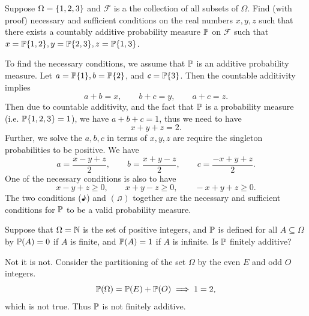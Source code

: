\begin{problem}
	Suppose $ \Omega = \{1,2,3\} $ and $ \mathcal{F} $ is a the collection of all subsets of $ \Omega $. Find (with proof) necessary and sufficient conditions on the real numbers $ x,y,z $ such that there exists a countably additive probability measure $ \mathbb{P} $ on $ \mathcal{F} $ such that $ x = \mathbb{P}\{1,2\}, y=\mathbb{P}\{2,3\}, z=\mathbb{P}\{1,3\} $.
\end{problem}
\begin{solution}
	To find the necessary conditions, we assume that $ \mathbb{P} $ is an additive probability measure. Let $ a = \mathbb{P}\{1\}, b=\mathbb{P}\{2\} $, and $ c = \mathbb{P}\{3\} $. Then the countable additivity implies
	\[ a+b=x,\qquad b+c=y,\qquad a+c=z. \]
	Then due to countable additivity, and the fact that $ \mathbb{P} $ is a probability measure (i.e. $ \mathbb{P}\{1,2,3\} = 1 $), we have $ a+b+c = 1 $, thus we need to have
	\[ x+y+z = 2. \tag{\eighthnote} \]
	Further, we solve the $ a,b,c $ in terms of $ x,y,z $ are require the singleton probabilities to be positive. We have
	\[ a = \frac{x-y+z}{2},\qquad b = \frac{x+y-z}{2},\qquad c=\frac{-x+y+z}{2}. \]
	One of the necessary conditions is also to have
	\[ x-y+z\geq0,\qquad x+y-z\geq0,\qquad -x+y+z \geq0. \tag{\twonotes}  \]
	The two conditions ($ \eighthnote $) and $ (\twonotes) $  together are the necessary and sufficient conditions for $ \mathbb{P} $ to be a valid probability measure.
\end{solution}

\begin{problem}
	Suppose that $ \Omega = \mathbb{N} $ is the set of positive integers, and $ \mathbb{P} $ is defined for all $ A\subseteq \Omega $ by $ \mathbb{P}(A) = 0 $ if $ A $ is finite, and $ \mathbb{P}(A) = 1 $ if $ A $ is infinite. Is $ \mathbb{P} $ finitely additive?
\end{problem}
\begin{solution}
	Not it is not. Consider the partitioning of the set $ \Omega $ by the even $ E $ and odd $ O $ integers.
	\[ \mathbb{P}(\Omega) = \mathbb{P}(E) + \mathbb{P}(O) \implies 1 = 2, \]
	which is not true. Thus $ \mathbb{P} $ is not finitely additive.
\end{solution}

